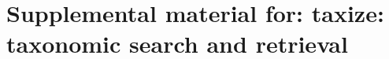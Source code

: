 \chapter{Supplemental material for: taxize: taxonomic search and retrieval}
\label{ap:taxize}  




